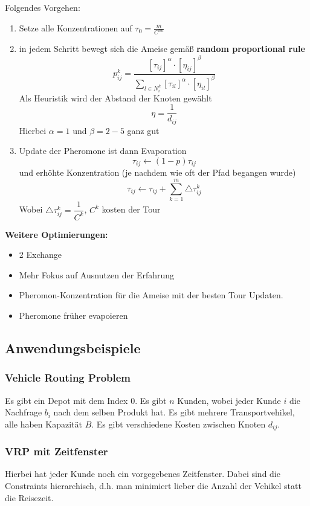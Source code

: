 \documentclass[a4paper]{article}
\begin{document}
Folgendes Vorgehen:
\begin{enumerate}
	\item Setze alle Konzentrationen auf $\tau_0 = \frac{m}{C^{nn}}$
	\item in jedem Schritt bewegt sich die Ameise gemäß \textbf{random proportional rule}
	$$p_{ij}^k=\dfrac{[\tau_{ij}]^\alpha\cdot[\eta_{ij}]^\beta}{\sum_{l\in N_i^k} [\tau_{il}]^\alpha\cdot[\eta_{il}]^\beta}$$
	Als Heuristik wird der Abstand der Knoten gewählt 
	$$\eta = \frac{1}{d_{ij}}$$
	Hierbei $\alpha = 1$ und $\beta= 2-5$ ganz gut
	\item Update der Pheromone ist dann Evaporation
	$$\tau_{ij} \leftarrow (1-p)\tau_{ij}$$ 
	und erhöhte Konzentration (je nachdem wie oft der Pfad begangen wurde)
	$$\tau_{ij} \leftarrow \tau_{ij}+\sum_{k=1}^{m} \triangle \tau_{ij}^k$$ 
	Wobei $\triangle \tau_{ij}^k = \dfrac{1}{C^k}$, $C^k$ kosten der Tour
\end{enumerate}
\textbf{Weitere Optimierungen:}
\begin{itemize}
	\item 2 Exchange
	\item Mehr Fokus auf Ausnutzen der Erfahrung
	\item Pheromon-Konzentration für die Ameise mit der besten Tour Updaten.
	\item Pheromone früher evapoieren
\end{itemize} 

\subsection{Anwendungsbeispiele}
\subsubsection{Vehicle Routing Problem}
Es gibt ein Depot mit dem Index $0$. Es gibt $n$ Kunden, wobei jeder Kunde $i$ die Nachfrage $b_i$ nach dem selben Produkt hat. Es gibt mehrere Transportvehikel, alle haben Kapazität $B$. Es gibt verschiedene Kosten zwischen Knoten $d_{ij}$.\\

\subsubsection{VRP mit Zeitfenster}
Hierbei hat jeder Kunde noch ein vorgegebenes Zeitfenster. Dabei sind die Constraints hierarchisch, d.h. man minimiert lieber die Anzahl der Vehikel statt die Reisezeit.
	
\end{document}
